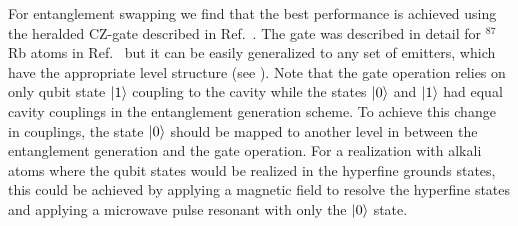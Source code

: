 For entanglement swapping we find that the best performance is achieved using
the heralded CZ-gate described in Ref.~\cite{johannes}. The gate was described
in detail for ${}^{87}$Rb atoms in Ref.~\cite{johannes} but it can be easily
generalized to any set of emitters, which have the appropriate level structure
(see ). Note that the gate operation relies on only qubit
state $| 1 \rangle$ coupling to the cavity while the states $| 0 \rangle$ and $| 1 \rangle$
had equal cavity couplings in the entanglement generation scheme. To achieve
this change in couplings, the state $| 0 \rangle$ should be mapped to another level
in between the entanglement generation and the gate operation. For a realization
with alkali atoms where the qubit states would be realized in the hyperfine
grounds states, this could be achieved by applying a magnetic field to resolve
the hyperfine states and applying a microwave pulse resonant with only the
$| 0 \rangle$ state.
